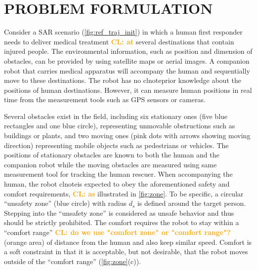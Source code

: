 \documentclass[journal]{IEEEtran}
\DeclareRobustCommand{\clnote}[1]{\ifthenelse{\boolean{include-notes}}%
	{\textcolor{orange}{\textbf{CL: #1}}}{}}
\begin{document}
	\section{PROBLEM FORMULATION}\label{sec:formulation}
	Consider a SAR scenario (\cref{fig:ref_traj_init}) in which a human first responder needs to deliver medical treatment \clnote{at} several destinations that contain injured people. 
	The environmental information, such as position and dimension of obstacles, can be provided by using satellite maps or aerial images.
	A companion robot that carries medical apparatus will accompany the human and sequentially move to these destinations.
	The robot has no clnote{prior} knowledge about the positions of human destinations.
	However, it can measure human positions in real time from the measurement tools such as GPS sensors or cameras.
	
	Several obstacles exist in the field, including six stationary ones (five blue rectangles and one blue circle), representing unmovable obstructions such as buildings or plants, and two moving ones (pink dots with arrows showing moving direction) representing mobile objects such as pedestrians or vehicles.
	The positions of stationary obstacles are known to both the human and the companion robot while the moving obstacles are measured using same measurement tool for tracking the human rescuer.
	When accompanying the human, the robot clnote{is expected to obey} the aforementioned safety and comfort requirements, \clnote{as} illustrated in \cref{fig:zone}.
	To be specific, a circular ``unsafety zone'' (blue circle) with radius $d_s$ is defined around the target person.
	Stepping into the ``unsafety zone'' is considered as unsafe behavior and thus should be strictly prohibited.
	The comfort requires the robot to stay within a ``comfort range'' \clnote{do we use "comfort zone" or "comfort range"?} (orange area) of  distance from the human and also keep similar speed.
	Comfort is a soft constraint in that it is acceptable, but not desirable, that the robot moves outside of the ``comfort range'' (\cref{fig:zone}(c)).
	
\end{document}
